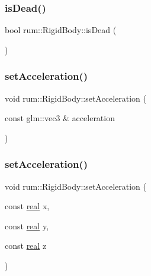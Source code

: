 \subsubsection{\texorpdfstring{is\+Dead()}{isDead()}}
{\footnotesize\ttfamily bool rum\+::\+Rigid\+Body\+::is\+Dead (\begin{DoxyParamCaption}{ }\end{DoxyParamCaption})}

\mbox{\label{classrum_1_1_rigid_body_a217a8370a7196e29e2e02fa57cde9bb4}} 
\subsubsection{\texorpdfstring{set\+Acceleration()}{setAcceleration()}\hspace{0.1cm}{\footnotesize\ttfamily [1/2]}}
{\footnotesize\ttfamily void rum\+::\+Rigid\+Body\+::set\+Acceleration (\begin{DoxyParamCaption}\item[{const glm\+::vec3 \&}]{acceleration }\end{DoxyParamCaption})}

\mbox{\label{classrum_1_1_rigid_body_a663501367c795254a324349d55b3f6f6}} 
\subsubsection{\texorpdfstring{set\+Acceleration()}{setAcceleration()}\hspace{0.1cm}{\footnotesize\ttfamily [2/2]}}
{\footnotesize\ttfamily void rum\+::\+Rigid\+Body\+::set\+Acceleration (\begin{DoxyParamCaption}\item[{const \hyperlink{namespacerum_a7e8cca23573d5eaead0f138cbaa4862c}{real}}]{x,  }\item[{const \hyperlink{namespacerum_a7e8cca23573d5eaead0f138cbaa4862c}{real}}]{y,  }\item[{const \hyperlink{namespacerum_a7e8cca23573d5eaead0f138cbaa4862c}{real}}]{z }\end{DoxyParamCaption})}

